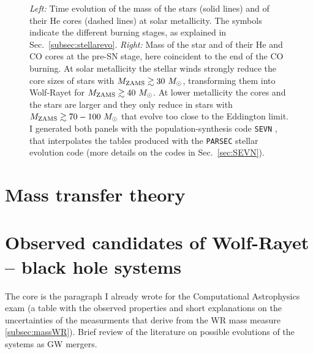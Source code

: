 \documentclass[a4paper,titlepage]{book}     	%
\newcommand{\sun}{\ensuremath{_\odot}}
\newcommand{\mzams}{M_\textup{ZAMS}}
\newcommand{\msun}{\ensuremath{M\sun}}
\begin{document}
\begin{figure}[h!]
\begin{minipage}{.49\textwidth}
	\end{minipage}
	\caption{\emph{Left:} Time evolution of the mass of the stars (solid lines) and of their He cores (dashed lines) at solar metallicity. The symbols indicate the different burning stages, as explained in Sec.\ \ref{subsec:stellarevo}. \emph{Right:} Mass of the star and of their He and CO cores at the pre-SN stage, here coincident to the end of the CO burning. At solar metallicity the stellar winds strongly reduce the core sizes of stars with $\mzams \gtrsim 30 ~\msun$, transforming them into Wolf-Rayet for $\mzams \gtrsim 40 ~\msun$. At lower metallicity the cores and the stars are larger and they only reduce in stars with $\mzams \gtrsim 70-100 ~\msun$ that evolve too close to the Eddington limit. I generated both panels with the population-synthesis code \texttt{SEVN} \cite{spera2019_mergingBBH}, that interpolates the tables produced with the \texttt{PARSEC} stellar evolution code \cite{parsec2015_chen} (more details on the codes in Sec.\ \ref{sec:SEVN}).}\label{fig:masslostWR}
\end{figure}




\section{Mass transfer theory}\label{subsec:masstransfer}






\section{Observed candidates of Wolf-Rayet -- black hole systems}\label{sec:WRBHobserved}
The core is the paragraph I already wrote for the Computational Astrophysics exam (a table with the observed properties and short explanations on the uncertainties of the measurments that derive from the WR mass measure \ref{subsec:massWR}). Brief review of the literature on possible evolutions of the systems as GW mergers.\\
\end{document}
